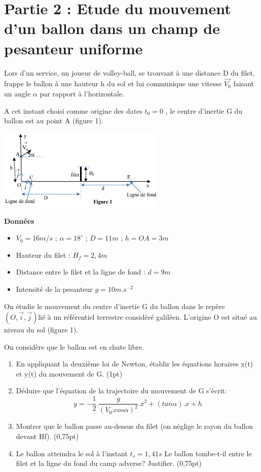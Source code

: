 \documentclass[12pt]{article}
\begin{document}
\section*{Partie 2 : Etude du mouvement d’un ballon dans un champ de pesanteur uniforme }
  Lors d’un service, un joueur de volley-ball, se trouvant à une distance D du
filet, frappe le ballon à une hauteur h du sol et lui communique une vitesse $\vec{V_0}$
faisant un angle $\alpha$ par rapport à l’horizontale.

   A cet instant choisi comme origine des dates $t_0 = 0$
, le centre d’inertie G du ballon est au point A (figure 1).
  
   \begin{center}
	\includegraphics[width=0.6\textwidth]{./img/chute_libreSx.png}
  \end{center}
   \textbf{Données}

 \begin{itemize}
   \item $V_0 = 16 m/s$ ; $\alpha = 18^{\circ}$ ; $D=11m$ ; $h = OA= 3m$
   \item Hauteur du filet : $H_f = 2,4m$
   \item Distance entre le filet et la ligne de fond : $d =9m$
   \item Intensité de la pesanteur $g = 10 m.s^{-2}$
 \end{itemize}
   On étudie le mouvement du centre d’inertie G du ballon dans le repère $(O,\vec{i} , \vec{j} )$lié à un référentiel terrestre
considéré galiléen. L’origine O est situé au niveau du sol (figure 1).

On considère que le ballon est en chute libre.

\begin{enumerate}
  \item En appliquant la deuxième loi de Newton, établir les équations horaires x(t) et y(t) du mouvement de G. (1pt)
  \item Déduire que l’équation de la trajectoire du mouvement de G s’écrit: $$y = - \frac{1}{2}. \frac{g}{(V_0.cos\alpha)^2}.x^2 + (tan\alpha).x + h$$
  \item Montrer que le ballon passe au-dessus du filet (on néglige le rayon du ballon devant Hf). (0,75pt)
  \item Le ballon atteindra le sol à l’instant $t_s=1,41s$
    Le ballon tombe-t-il entre le filet et la ligne du fond du camp adverse? Justifier. (0,75pt)
\end{enumerate}
\end{document}
